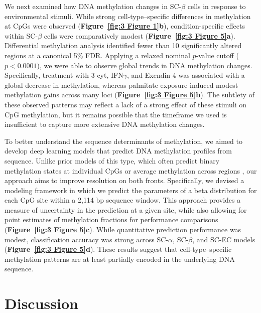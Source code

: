 We next examined how DNA methylation changes in SC-$\beta$ cells in response to environmental stimuli. While strong cell-type–specific differences in methylation at CpGs were observed (\textbf{Figure~\ref{fig:3 Figure 1}\textbf{b}}), condition-specific effects within SC-$\beta$ cells were comparatively modest (\textbf{Figure~\ref{fig:3 Figure 5}\textbf{a}}). Differential methylation analysis identified fewer than 10 significantly altered regions at a canonical 5\% FDR. Applying a relaxed nominal $p$-value cutoff ($p < 0.0001$), we were able to observe global trends in DNA methylation changes. Specifically, treatment with 3-cyt, IFN$\gamma$, and Exendin-4 was associated with a global decrease in methylation, whereas palmitate exposure induced modest methylation gains across many loci (\textbf{Figure~\ref{fig:3 Figure 5}\textbf{b}}). The subtlety of these observed patterns may reflect a lack of a strong effect of these stimuli on CpG methylation, but it remains possible that the timeframe we used is insufficient to capture more extensive DNA methylation changes.

To better understand the sequence determinants of methylation, we aimed to develop deep learning models that predict DNA methylation profiles from sequence. Unlike prior models of this type, which often predict binary methylation states at individual CpGs or average methylation across regions \cite{Zeng2017-kb}, our approach aims to improve resolution on both fronts. Specifically, we devised a modeling framework in which we predict the parameters of a beta distribution for each CpG site within a 2,114 bp sequence window. This approach provides a measure of uncertainty in the prediction at a given site, while also allowing for point estimates of methylation fractions for performance comparisons (\textbf{Figure~\ref{fig:3 Figure 5}\textbf{c}}). While quantitative prediction performance was modest, classification accuracy was strong across SC-$\alpha$, SC-$\beta$, and SC-EC models (\textbf{Figure~\ref{fig:3 Figure 5}\textbf{d}}). These results suggest that cell-type–specific methylation patterns are at least partially encoded in the underlying DNA sequence.

\section{Discussion}

